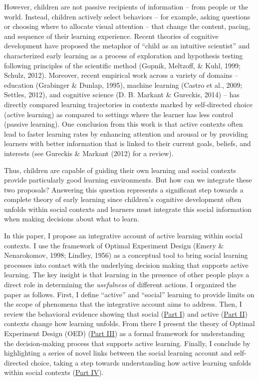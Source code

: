 \documentclass[oneside]{report}
\begin{document}
However, children are not passive recipients of information -- from
people or the world. Instead, children actively select behaviors -- for
example, asking questions or choosing where to allocate visual attention
-- that change the content, pacing, and sequence of their learning
experience. Recent theories of cognitive development have proposed the
metaphor of ``child as an intuitive scientist'' and characterized early
learning as a process of exploration and hypothesis testing following
principles of the scientific method (Gopnik, Meltzoff, \& Kuhl, 1999;
Schulz, 2012). Moreover, recent empirical work across a variety of
domains -- education (Grabinger \& Dunlap, 1995), machine learning
(Castro et al., 2009; Settles, 2012), and cognitive science (D. B.
Markant \& Gureckis, 2014) -- has directly compared learning
trajectories in contexts marked by self-directed choice (active
learning) as compared to settings where the learner has less control
(passive learning). One conclusion from this work is that active
contexts often lead to faster learning rates by enhancing attention and
arousal or by providing learners with better information that is linked
to their current goals, beliefs, and interests (see Gureckis \& Markant
(2012) for a review).

Thus, children are capable of guiding their own learning and social
contexts provide particularly good learning environments. But how can we
integrate these two proposals? Answering this question represents a
significant step towards a complete theory of early learning since
children's cognitive development often unfolds within social contexts
and learners must integrate this social information when making
decisions about what to learn.

In this paper, I propose an integrative account of active learning
within social contexts. I use the framework of Optimal Experiment Design
(Emery \& Nenarokomov, 1998; Lindley, 1956) as a conceptual tool to
bring social learning processes into contact with the underlying
decision making that supports active learning. The key insight is that
learning in the presence of other people plays a direct role in
determining the \emph{usefulness} of different actions. I organized the
paper as follows. First, I define ``active'' and ``social'' learning to
provide limits on the scope of phenomena that the integrative account
aims to address. Then, I review the behavioral evidence showing that
social (\protect\hyperlink{p1}{Part I}) and active
(\protect\hyperlink{p2}{Part II}) contexts change how learning unfolds.
From there I present the theory of Optimal Experiment Design (OED)
(\protect\hyperlink{p3}{Part III}) as a formal framework for
understanding the decision-making process that supports active learning.
Finally, I conclude by highlighting a series of novel links between the
social learning account and self-directed choice, taking a step towards
understanding how active learning unfolds within social contexts
(\protect\hyperlink{p4}{Part IV}).
\end{document}
